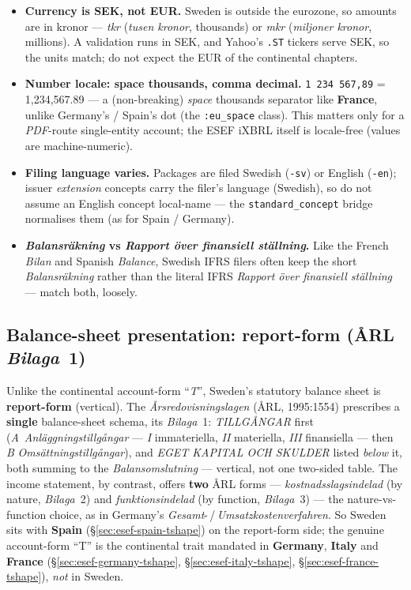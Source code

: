 \documentclass[11pt,a4paper]{report}
\begin{document}
\begin{itemize}
  \item \textbf{Currency is SEK, not EUR.} Sweden is outside the eurozone, so amounts are in kronor ---
    \emph{tkr} (\emph{tusen kronor}, thousands) or \emph{mkr} (\emph{miljoner kronor}, millions). A validation
    runs in SEK, and Yahoo's \texttt{.ST} tickers serve SEK, so the units match; do not expect the EUR of the
    continental chapters.
  \item \textbf{Number locale: space thousands, comma decimal.} \texttt{1\,234\,567,89} = 1{,}234{,}567.89 ---
    a (non-breaking) \emph{space} thousands separator like \textbf{France}, unlike Germany's / Spain's dot (the
    \texttt{:eu\_space} class). This matters only for a \emph{PDF}-route single-entity account; the ESEF iXBRL
    itself is locale-free (values are machine-numeric).
  \item \textbf{Filing language varies.} Packages are filed Swedish (\texttt{-sv}) or English (\texttt{-en});
    issuer \emph{extension} concepts carry the filer's language (Swedish), so do not assume an English concept
    local-name --- the \texttt{standard\_concept} bridge normalises them (as for Spain / Germany).
  \item \textbf{\emph{Balansr\"akning} vs \emph{Rapport \"over finansiell st\"allning}.} Like the French
    \emph{Bilan} and Spanish \emph{Balance}, Swedish IFRS filers often keep the short \emph{Balansr\"akning}
    rather than the literal IFRS \emph{Rapport \"over finansiell st\"allning} --- match both, loosely.
\end{itemize}

\subsection{Balance-sheet presentation: report-form (ÅRL \emph{Bilaga}~1)}
\label{sec:esef-sweden-tshape}

Unlike the continental account-form ``\emph{T}'', Sweden's statutory balance sheet is \textbf{report-form}
(vertical). The \emph{\AA rsredovisningslagen} (ÅRL, 1995:1554) prescribes a \textbf{single} balance-sheet
schema, its \emph{Bilaga}~1: \emph{TILLG\AA NGAR} first (\emph{A}~\emph{Anl\"aggningstillg\aa ngar} ---
\emph{I} immateriella, \emph{II} materiella, \emph{III} finansiella --- then \emph{B}
\emph{Oms\"attningstillg\aa ngar}), and \emph{EGET KAPITAL OCH SKULDER} listed \emph{below} it, both summing to
the \emph{Balansomslutning} --- vertical, not one two-sided table. The income statement, by contrast, offers
\textbf{two} ÅRL forms --- \emph{kostnadsslagsindelad} (by nature, \emph{Bilaga}~2) and \emph{funktionsindelad}
(by function, \emph{Bilaga}~3) --- the nature-vs-function choice, as in Germany's
\emph{Gesamt}-\,/\,\emph{Umsatzkostenverfahren}. So Sweden sits with \textbf{Spain} (\S\ref{sec:esef-spain-tshape})
on the report-form side; the genuine account-form ``T'' is the continental trait mandated in \textbf{Germany},
\textbf{Italy} and \textbf{France} (\S\ref{sec:esef-germany-tshape}, \S\ref{sec:esef-italy-tshape},
\S\ref{sec:esef-france-tshape}), \emph{not} in Sweden.
\end{document}
